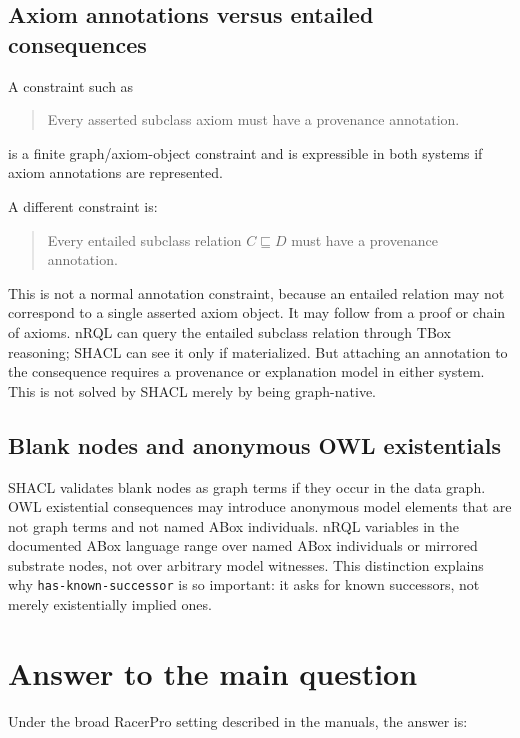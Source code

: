 \documentclass[11pt,letterpaper]{article}
\newcommand{\nrql}{nRQL}
\newcommand{\racer}{RacerPro}
\newcommand{\shacl}{SHACL}
\newcommand{\abox}{ABox}
\newcommand{\tbox}{TBox}
\newcommand{\owl}{OWL}
\begin{document}
\subsection{Axiom annotations versus entailed consequences}

A constraint such as

\begin{quote}
Every asserted subclass axiom must have a provenance annotation.
\end{quote}

is a finite graph/axiom-object constraint and is expressible in both systems if axiom annotations are represented.

A different constraint is:

\begin{quote}
Every entailed subclass relation $C \sqsubseteq D$ must have a provenance annotation.
\end{quote}

This is not a normal annotation constraint, because an entailed relation may not correspond to a single asserted axiom object. It may follow from a proof or chain of axioms. \nrql{} can query the entailed subclass relation through \tbox{} reasoning; \shacl{} can see it only if materialized. But attaching an annotation to the consequence requires a provenance or explanation model in either system. This is not solved by \shacl{} merely by being graph-native.

\subsection{Blank nodes and anonymous OWL existentials}

\shacl{} validates blank nodes as graph terms if they occur in the data graph. \owl{} existential consequences may introduce anonymous model elements that are not graph terms and not named \abox{} individuals. \nrql{} variables in the documented \abox{} language range over named \abox{} individuals or mirrored substrate nodes, not over arbitrary model witnesses. This distinction explains why \texttt{has-known-successor} is so important: it asks for known successors, not merely existentially implied ones.

\section{Answer to the main question}

Under the broad \racer{} setting described in the manuals, the answer is:
\end{document}

